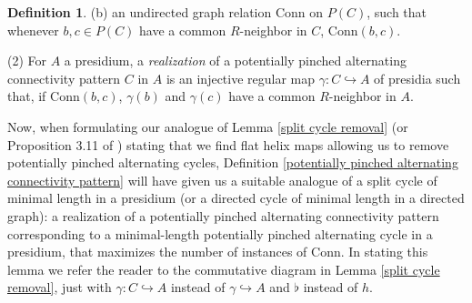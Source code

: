 \documentclass{amsart}
\theoremstyle{definition}
\newtheorem{definition}[theorem]{Definition}
\theoremstyle{remark}
\numberwithin{equation}{section}
\begin{document}
\begin{definition}
      (b) an undirected graph relation $\mathrm{Conn}$ on $P(C)$, such that whenever $b, c \in P(C)$ have a common $R$-neighbor in  $C$, $\mathrm{Conn}(b,c)$.


(2) For $A$ a presidium, a \textit{realization} of a potentially pinched alternating connectivity pattern $C$ in $A$ is an injective regular map $\gamma: C \hookrightarrow A$ of presidia such that, if $\mathrm{Conn}(b, c)$, $\gamma(b)$ and $\gamma(c)$ have a common $R$-neighbor in $A$. 
      
\end{definition}

Now, when formulating our analogue of Lemma \ref{split cycle removal} (or Proposition 3.11 of \cite{ApproxOrder}) stating that we find flat helix maps allowing us to remove potentially pinched alternating cycles, Definition \ref{potentially pinched alternating connectivity pattern} will have given us a suitable analogue of a split cycle of minimal length in a presidium (or a directed cycle of minimal length in a directed graph): a realization of a potentially pinched alternating connectivity pattern corresponding to a minimal-length potentially pinched alternating cycle in a presidium, that maximizes the number of instances of $\mathrm{Conn}$. In stating this lemma we refer the reader to the commutative diagram in Lemma \ref{split cycle removal}, just with $\gamma: C \hookrightarrow A$ instead of $\gamma \hookrightarrow A$ and $\flat$ instead of $h$.
\end{document}
